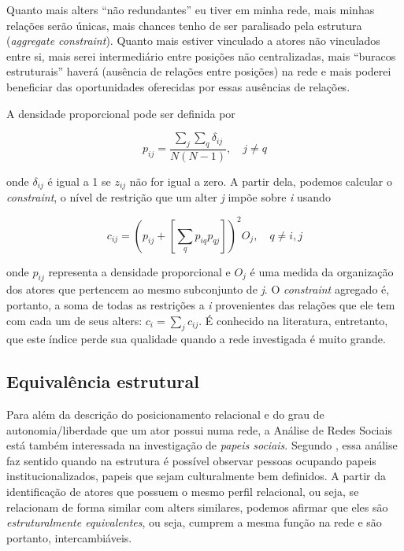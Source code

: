 \documentclass[a4paper, 12pt, openright, oneside, german, french, english, brazil]{abntex2}
\begin{document}
	\begin{citacao}
		Quanto mais alters ``não redundantes'' eu tiver em minha rede, mais minhas relações serão únicas, mais chances tenho de ser paralisado pela estrutura (\textit{aggregate constraint}). Quanto mais estiver vinculado a atores não vinculados entre si, mais serei intermediário entre posições não centralizadas, mais ``buracos estruturais'' haverá (ausência de relações entre posições) na rede e mais poderei beneficiar das oportunidades oferecidas por essas ausências de relações. \cite[p. 71-2]{lazega2014redes}
	\end{citacao}

	A densidade proporcional pode ser definida por 
	
	\begin{equation}
	p_{ij} = \frac{\sum_j \sum_q \delta_{ij}}{N (N - 1)}, \quad j \neq q
	\end{equation}
	
	onde $\delta_{ij}$ é igual a 1 se $z_{ij}$ não for igual a zero. A partir dela, podemos calcular o \textit{constraint}, o nível de restrição que um alter \textit{j} impõe sobre \textit{i} usando
	
	\begin{equation}
	c_{ij} = \left(p_{ij} + \left[\sum_q p_{iq} p_{qj} \right]\right)^2 O_j, \quad q \neq i,j
	\end{equation}
	
	onde $p_{ij}$ representa a densidade proporcional e $O_j$ é uma medida da organização dos atores que pertencem ao mesmo subconjunto de \textit{j}. O \textit{constraint} agregado é, portanto, a soma de todas as restrições a \textit{i} provenientes das relações que ele tem com cada um de seus alters: $c_i = \sum_j c_{ij}$. É conhecido na literatura, entretanto, que este índice perde sua qualidade quando a rede investigada é muito grande.
	
	
	\subsection{Equivalência estrutural}
	
	Para além da descrição do posicionamento relacional e do grau de autonomia/liberdade que um ator possui numa rede, a Análise de Redes Sociais está também interessada na investigação de \textit{papeis sociais}. Segundo , essa análise faz sentido quando na estrutura é possível observar pessoas ocupando papeis institucionalizados, papeis que sejam culturalmente bem definidos. A partir da identificação de atores que possuem o mesmo perfil relacional, ou seja, se relacionam de forma similar com alters similares, podemos afirmar que eles são \textit{estruturalmente equivalentes}, ou seja, cumprem a mesma função na rede e são portanto, intercambiáveis.
	
\end{document}

